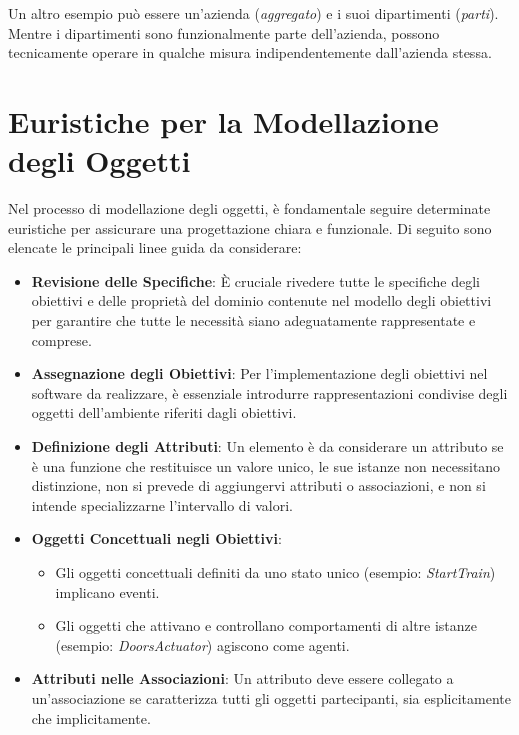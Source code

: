 Un altro esempio può essere un'azienda (\textit{aggregato}) e i suoi dipartimenti (\textit{parti}).
Mentre i dipartimenti sono funzionalmente parte dell'azienda, possono tecnicamente
operare in qualche misura indipendentemente dall'azienda stessa.
\section{Euristiche per la Modellazione degli Oggetti}

Nel processo di modellazione degli oggetti, è fondamentale seguire determinate 
euristiche per assicurare una progettazione chiara e funzionale. Di seguito sono 
elencate le principali linee guida da considerare:

\begin{itemize}
  \item \textbf{Revisione delle Specifiche}: È cruciale rivedere tutte le specifiche 
  degli obiettivi e delle proprietà del dominio contenute nel modello degli obiettivi 
  per garantire che tutte le necessità siano adeguatamente rappresentate e comprese.
  
  \item \textbf{Assegnazione degli Obiettivi}: Per l'implementazione degli obiettivi 
  nel software da realizzare, è essenziale introdurre rappresentazioni condivise degli 
  oggetti dell'ambiente riferiti dagli obiettivi.
  
  \item \textbf{Definizione degli Attributi}: Un elemento è da considerare un attributo 
  se è una funzione che restituisce un valore unico, le sue istanze non necessitano 
  distinzione, non si prevede di aggiungervi attributi o associazioni, e non si 
  intende specializzarne l'intervallo di valori.
  
  \item \textbf{Oggetti Concettuali negli Obiettivi}:
  \begin{itemize}
    \item Gli oggetti concettuali definiti da uno stato unico 
    (esempio: \textit{StartTrain}) implicano eventi.
    \item Gli oggetti che attivano e controllano comportamenti di altre 
    istanze (esempio: \textit{DoorsActuator}) agiscono come agenti.
  \end{itemize}
  
  \item \textbf{Attributi nelle Associazioni}: Un attributo deve essere 
  collegato a un'associazione se caratterizza tutti gli oggetti partecipanti, 
  sia esplicitamente che implicitamente.
  

\end{itemize}
